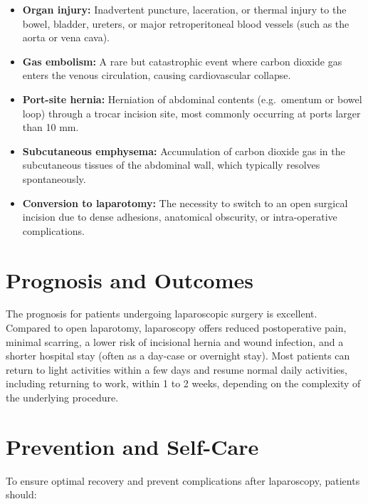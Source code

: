 \begin{itemize}
    \item \textbf{Organ injury:} Inadvertent puncture, laceration, or thermal injury to the bowel, bladder, ureters, or major retroperitoneal blood vessels (such as the aorta or vena cava).
    \item \textbf{Gas embolism:} A rare but catastrophic event where carbon dioxide gas enters the venous circulation, causing cardiovascular collapse.
    \item \textbf{Port-site hernia:} Herniation of abdominal contents (e.g.\ omentum or bowel loop) through a trocar incision site, most commonly occurring at ports larger than 10 mm.
    \item \textbf{Subcutaneous emphysema:} Accumulation of carbon dioxide gas in the subcutaneous tissues of the abdominal wall, which typically resolves spontaneously.
    \item \textbf{Conversion to laparotomy:} The necessity to switch to an open surgical incision due to dense adhesions, anatomical obscurity, or intra-operative complications.
\end{itemize}

\section*{Prognosis and Outcomes}
The prognosis for patients undergoing laparoscopic surgery is excellent. Compared to open laparotomy, laparoscopy offers reduced postoperative pain, minimal scarring, a lower risk of incisional hernia and wound infection, and a shorter hospital stay (often as a day-case or overnight stay). Most patients can return to light activities within a few days and resume normal daily activities, including returning to work, within 1 to 2 weeks, depending on the complexity of the underlying procedure.

\section*{Prevention and Self-Care}
To ensure optimal recovery and prevent complications after laparoscopy, patients should:

